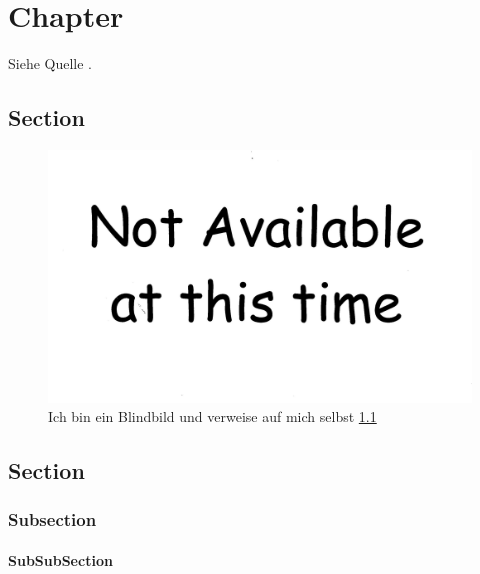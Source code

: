 \chapter{Chapter}
Siehe Quelle \cite{BlindBuch}.
\section{Section}
\begin{figure}[H]
	\centering
	\includegraphics[width=1\textwidth]{Bilder/BlindBilder/Notavailable.jpg}
	\caption{Ich bin ein Blindbild und verweise auf mich selbst \ref{Blinblid}}
	\label{Blinblid}
\end{figure}

 
 \section{Section}
 
 \subsection{Subsection}
 
 \subsubsection{SubSubSection}